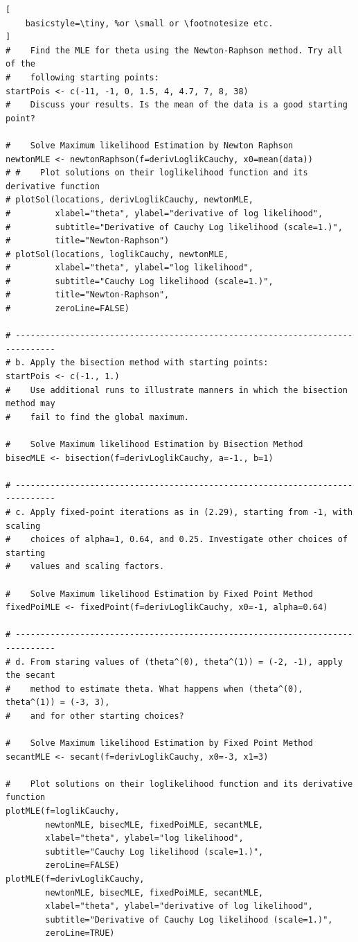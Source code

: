 \begin{appendices}
\begin{lstlisting}[
	basicstyle=\tiny, %or \small or \footnotesize etc.
]
#    Find the MLE for theta using the Newton-Raphson method. Try all of the 
#    following starting points: 
startPois <- c(-11, -1, 0, 1.5, 4, 4.7, 7, 8, 38)
#    Discuss your results. Is the mean of the data is a good starting point?

#    Solve Maximum likelihood Estimation by Newton Raphson
newtonMLE <- newtonRaphson(f=derivLoglikCauchy, x0=mean(data))
# #    Plot solutions on their loglikelihood function and its derivative function
# plotSol(locations, derivLoglikCauchy, newtonMLE,
#         xlabel="theta", ylabel="derivative of log likelihood", 
#         subtitle="Derivative of Cauchy Log likelihood (scale=1.)",
#         title="Newton-Raphson")
# plotSol(locations, loglikCauchy, newtonMLE, 
#         xlabel="theta", ylabel="log likelihood", 
#         subtitle="Cauchy Log likelihood (scale=1.)",
#         title="Newton-Raphson",
#         zeroLine=FALSE)

# ------------------------------------------------------------------------------
# b. Apply the bisection method with starting points:
startPois <- c(-1., 1.)
#    Use additional runs to illustrate manners in which the bisection method may 
#    fail to find the global maximum. 

#    Solve Maximum likelihood Estimation by Bisection Method
bisecMLE <- bisection(f=derivLoglikCauchy, a=-1., b=1)

# ------------------------------------------------------------------------------
# c. Apply fixed-point iterations as in (2.29), starting from -1, with scaling 
#    choices of alpha=1, 0.64, and 0.25. Investigate other choices of starting 
#    values and scaling factors.

#    Solve Maximum likelihood Estimation by Fixed Point Method
fixedPoiMLE <- fixedPoint(f=derivLoglikCauchy, x0=-1, alpha=0.64)

# ------------------------------------------------------------------------------
# d. From staring values of (theta^(0), theta^(1)) = (-2, -1), apply the secant 
#    method to estimate theta. What happens when (theta^(0), theta^(1)) = (-3, 3), 
#    and for other starting choices?

#    Solve Maximum likelihood Estimation by Fixed Point Method
secantMLE <- secant(f=derivLoglikCauchy, x0=-3, x1=3)

#    Plot solutions on their loglikelihood function and its derivative function
plotMLE(f=loglikCauchy, 
        newtonMLE, bisecMLE, fixedPoiMLE, secantMLE, 
        xlabel="theta", ylabel="log likelihood", 
        subtitle="Cauchy Log likelihood (scale=1.)",
        zeroLine=FALSE)
plotMLE(f=derivLoglikCauchy, 
        newtonMLE, bisecMLE, fixedPoiMLE, secantMLE, 
        xlabel="theta", ylabel="derivative of log likelihood", 
        subtitle="Derivative of Cauchy Log likelihood (scale=1.)",
        zeroLine=TRUE)


\end{lstlisting}
\end{appendices}
